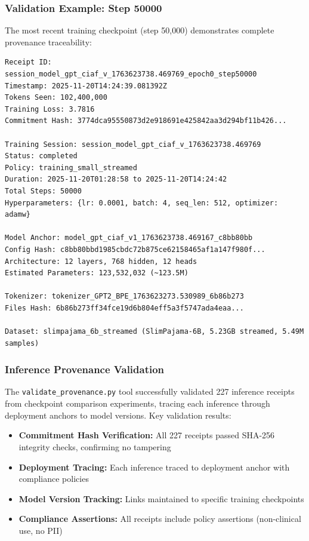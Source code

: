 \documentclass[11pt,a4paper]{article}
\begin{document}
\subsubsection{Validation Example: Step 50000}

The most recent training checkpoint (step 50,000) demonstrates complete provenance traceability:

\begin{lstlisting}[basicstyle=\small\ttfamily, breaklines=true]
Receipt ID: session_model_gpt_ciaf_v_1763623738.469769_epoch0_step50000
Timestamp: 2025-11-20T14:24:39.081392Z
Tokens Seen: 102,400,000
Training Loss: 3.7816
Commitment Hash: 3774dca95550873d2e918691e425842aa3d294bf11b426...

Training Session: session_model_gpt_ciaf_v_1763623738.469769
Status: completed
Policy: training_small_streamed
Duration: 2025-11-20T01:28:58 to 2025-11-20T14:24:42
Total Steps: 50000
Hyperparameters: {lr: 0.0001, batch: 4, seq_len: 512, optimizer: adamw}

Model Anchor: model_gpt_ciaf_v1_1763623738.469167_c8bb80bb
Config Hash: c8bb80bbd1985cbdc72b875ce62158465af1a147f980f...
Architecture: 12 layers, 768 hidden, 12 heads
Estimated Parameters: 123,532,032 (~123.5M)

Tokenizer: tokenizer_GPT2_BPE_1763623273.530989_6b86b273
Files Hash: 6b86b273ff34fce19d6b804eff5a3f5747ada4eaa...

Dataset: slimpajama_6b_streamed (SlimPajama-6B, 5.23GB streamed, 5.49M samples)
\end{lstlisting}

\subsubsection{Inference Provenance Validation}

The \texttt{validate\_provenance.py} tool successfully validated 227 inference receipts from checkpoint comparison experiments, tracing each inference through deployment anchors to model versions. Key validation results:

\begin{itemize}
    \item \textbf{Commitment Hash Verification:} All 227 receipts passed SHA-256 integrity checks, confirming no tampering
    \item \textbf{Deployment Tracing:} Each inference traced to deployment anchor with compliance policies
    \item \textbf{Model Version Tracking:} Links maintained to specific training checkpoints
    \item \textbf{Compliance Assertions:} All receipts include policy assertions (non-clinical use, no PII)
\end{itemize}
\end{document}
